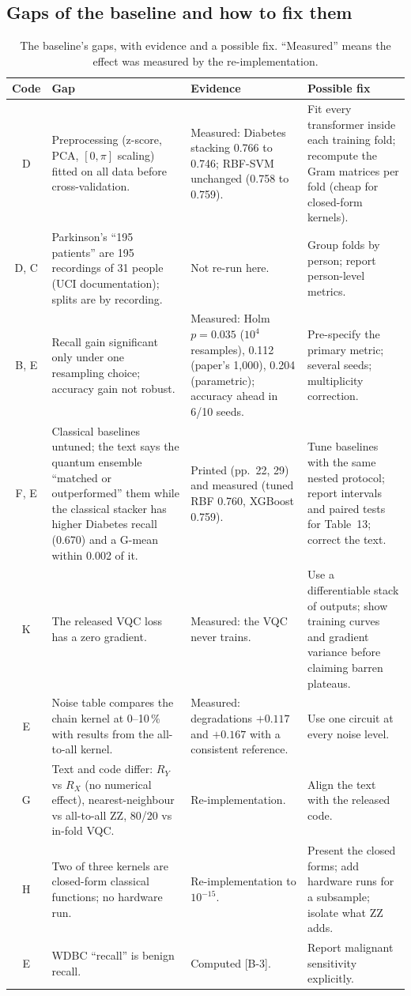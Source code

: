 \documentclass[11pt,a4paper]{article}
\newcommand{\chk}[1]{\textsf{\small [#1]}}
\begin{document}
\subsection{Gaps of the baseline and how to fix them}
\label{sec:basegaps}
\begin{table}[H]
\centering\footnotesize
\caption{The baseline's gaps, with evidence and a possible fix. ``Measured'' means the effect was measured by the re-implementation.}
\label{tab:basegaps}
\begin{tabularx}{\textwidth}{c L{4.3cm} Y Y}
\toprule
Code & Gap & Evidence & Possible fix \\
\midrule
D & Preprocessing (z-score, PCA, $[0,\pi]$ scaling) fitted on all data before cross-validation. & Measured: Diabetes stacking 0.766 to 0.746; RBF-SVM unchanged (0.758 to 0.759). & Fit every transformer inside each training fold; recompute the Gram matrices per fold (cheap for closed-form kernels). \\
D, C & Parkinson's ``195 patients'' are 195 recordings of 31 people (UCI documentation); splits are by recording. & Not re-run here. & Group folds by person; report person-level metrics. \\
B, E & Recall gain significant only under one resampling choice; accuracy gain not robust. & Measured: Holm $p=0.035$ ($10^4$ resamples), 0.112 (paper's 1,000), 0.204 (parametric); accuracy ahead in 6/10 seeds. & Pre-specify the primary metric; several seeds; multiplicity correction. \\
F, E & Classical baselines untuned; the text says the quantum ensemble ``matched or outperformed'' them while the classical stacker has higher Diabetes recall (0.670) and a G-mean within 0.002 of it. & Printed (pp.~22, 29) and measured (tuned RBF 0.760, XGBoost 0.759). & Tune baselines with the same nested protocol; report intervals and paired tests for Table~13; correct the text. \\
K & The released VQC loss has a zero gradient. & Measured: the VQC never trains. & Use a differentiable stack of outputs; show training curves and gradient variance before claiming barren plateaus. \\
E & Noise table compares the chain kernel at 0--10\,\% with results from the all-to-all kernel. & Measured: degradations $+0.117$ and $+0.167$ with a consistent reference. & Use one circuit at every noise level. \\
G & Text and code differ: $R_Y$ vs $R_X$ (no numerical effect), nearest-neighbour vs all-to-all ZZ, 80/20 vs in-fold VQC. & Re-implementation. & Align the text with the released code. \\
H & Two of three kernels are closed-form classical functions; no hardware run. & Re-implementation to $10^{-15}$. & Present the closed forms; add hardware runs for a subsample; isolate what ZZ adds. \\
E & WDBC ``recall'' is benign recall. & Computed \chk{B-3}. & Report malignant sensitivity explicitly. \\
\bottomrule
\end{tabularx}
\end{table}
\end{document}
